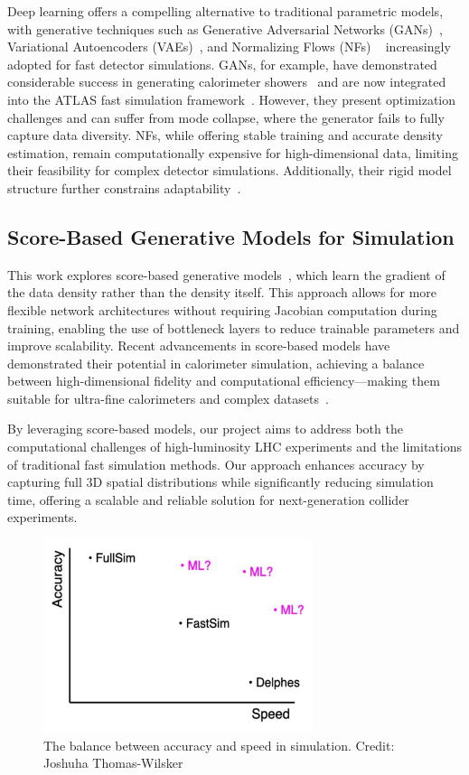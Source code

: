 Deep learning offers a compelling alternative to traditional parametric models, with generative techniques such as Generative Adversarial Networks (GANs)~\cite{goodfellow2014}, Variational Autoencoders (VAEs)~\cite{kingma2013}, and Normalizing Flows (NFs) ~\cite{dinh2016} increasingly adopted for fast detector simulations. GANs, for example, have demonstrated considerable success in generating calorimeter showers~\cite{paganini2018} and are now integrated into the ATLAS fast simulation framework~\cite{atlas2018}. However, they present optimization challenges and can suffer from mode collapse, where the generator fails to fully capture data diversity. NFs, while offering stable training and accurate density estimation, remain computationally expensive for high-dimensional data, limiting their feasibility for complex detector simulations. Additionally, their rigid model structure further constrains adaptability~\cite{verheyen2021, verheyen2021b}.

\subsection{Score-Based Generative Models for Simulation}
This work explores score-based generative models~\cite{song2020}, which learn the gradient of the data density rather than the density itself. This approach allows for more flexible network architectures without requiring Jacobian computation during training, enabling the use of bottleneck layers to reduce trainable parameters and improve scalability. Recent advancements in score-based models have demonstrated their potential in calorimeter simulation, achieving a balance between high-dimensional fidelity and computational efficiency—making them suitable for ultra-fine calorimeters and complex datasets~\cite{cms2017, cms2018}.

By leveraging score-based models, our project aims to address both the computational challenges of high-luminosity LHC experiments and the limitations of traditional fast simulation methods. Our approach enhances accuracy by capturing full 3D spatial distributions while significantly reducing simulation time, offering a scalable and reliable solution for next-generation collider experiments.

\begin{figure}[H]
\centering
\includegraphics[width=0.7\textwidth]{Figures/fast.png}
\caption{The balance between accuracy and speed in simulation. Credit: Joshuha Thomas-Wilsker}
\label{fast}
\end{figure}

